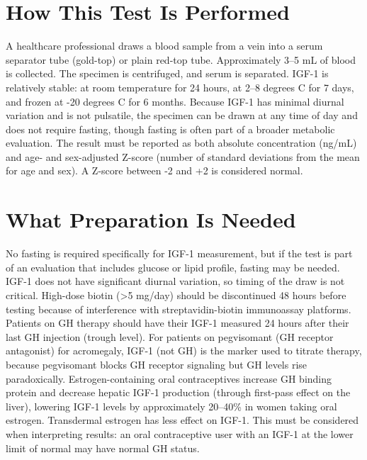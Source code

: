 \section*{How This Test Is Performed}
A healthcare professional draws a blood sample from a vein into a serum separator tube (gold-top) or plain red-top tube. Approximately 3--5 mL of blood is collected. The specimen is centrifuged, and serum is separated. IGF-1 is relatively stable: at room temperature for 24 hours, at 2--8 degrees C for 7 days, and frozen at -20 degrees C for 6 months. Because IGF-1 has minimal diurnal variation and is not pulsatile, the specimen can be drawn at any time of day and does not require fasting, though fasting is often part of a broader metabolic evaluation. The result must be reported as both absolute concentration (ng/mL) and age- and sex-adjusted Z-score (number of standard deviations from the mean for age and sex). A Z-score between -2 and +2 is considered normal.

\section*{What Preparation Is Needed}
No fasting is required specifically for IGF-1 measurement, but if the test is part of an evaluation that includes glucose or lipid profile, fasting may be needed. IGF-1 does not have significant diurnal variation, so timing of the draw is not critical. High-dose biotin (>5 mg/day) should be discontinued 48 hours before testing because of interference with streptavidin-biotin immunoassay platforms. Patients on GH therapy should have their IGF-1 measured 24 hours after their last GH injection (trough level). For patients on pegvisomant (GH receptor antagonist) for acromegaly, IGF-1 (not GH) is the marker used to titrate therapy, because pegvisomant blocks GH receptor signaling but GH levels rise paradoxically. Estrogen-containing oral contraceptives increase GH binding protein and decrease hepatic IGF-1 production (through first-pass effect on the liver), lowering IGF-1 levels by approximately 20--40\% in women taking oral estrogen. Transdermal estrogen has less effect on IGF-1. This must be considered when interpreting results: an oral contraceptive user with an IGF-1 at the lower limit of normal may have normal GH status.

